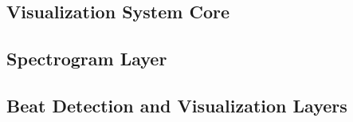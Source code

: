 


\subsection{Visualization System Core}
%

\subsection{Spectrogram Layer}



\subsection{Beat Detection and Visualization Layers}


